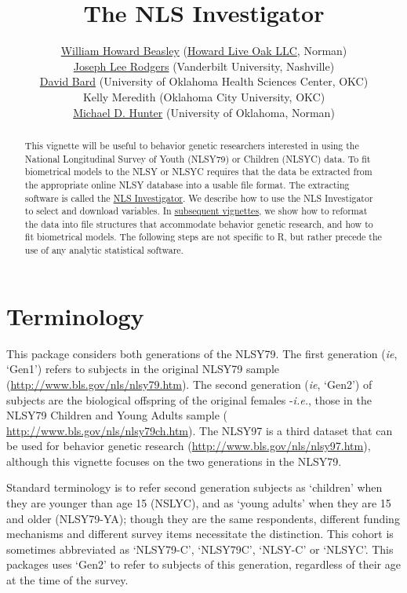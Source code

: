 \documentclass{article}\usepackage[]{graphicx}\usepackage[]{color}
\title{The NLS Investigator}
\author{
  \href{http://scholar.google.com/citations?user=ffsJTC0AAAAJ}{William Howard Beasley} (\href{http://howardliveoak.com/}{Howard Live Oak LLC}, Norman)\\
  \href{http://www.vanderbilt.edu/psychological_sciences/bio/joe-rodgers}{Joseph Lee Rodgers} (Vanderbilt University, Nashville)\\
  \href{http://find.ouhsc.edu/Faculty.aspx?FacultyID=1041}{David Bard} (University of Oklahoma Health Sciences Center, OKC)\\
  Kelly Meredith (Oklahoma City University, OKC)\\
  \href{http://students.ou.edu/H/Michael.D.Hunter-1/}{Michael D. Hunter} (University of Oklahoma, Norman)
}
\begin{document}
\newcommand{\code}[1]{\texttt{\small{#1}}}
\newcommand{\pkg}[1]{\textsf{\small{#1}}}
\let\proglang=\textsf
\newcommand{\R}{\proglang{R}} %

\maketitle
\tableofcontents

\begin{abstract}
This vignette will be useful to behavior genetic researchers interested in using the National Longitudinal Survey of Youth (NLSY79) or Children (NLSYC) data.  To fit biometrical models to the NLSY or NLSYC requires that the data be extracted from the appropriate online NLSY database into a usable file format.  The extracting software is called the \href{https://www.nlsinfo.org/investigator/pages/login.jsp}{NLS Investigator}.  We describe how to use the NLS Investigator to select and download variables.   In \href{http://cran.r-project.org/web/packages/NlsyLinks/}{subsequent vignettes}, we show how to reformat the data into file structures that accommodate behavior genetic research, and how to fit biometrical models.  The following steps are not specific to \R{}, but rather precede the use of any analytic statistical software.
\end{abstract}



\section{Terminology} %
This package considers both generations of the NLSY79.  The first generation (\emph{ie}, `Gen1') refers to subjects in the original NLSY79 sample (\url{http://www.bls.gov/nls/nlsy79.htm}).  The second generation (\emph{ie}, `Gen2') of subjects are the biological offspring of the original females -\emph{i.e.}, those in the NLSY79 Children and Young Adults sample ( \url{http://www.bls.gov/nls/nlsy79ch.htm}).  The NLSY97 is a third dataset that can be used for behavior genetic research (\url{http://www.bls.gov/nls/nlsy97.htm}), although this vignette focuses on the two generations in the NLSY79.

Standard terminology is to refer second generation subjects as `children' when they are younger than age 15 (NSLYC), and as `young adults' when they are 15 and older (NLSY79-YA); though they are the same respondents, different funding mechanisms and different survey items necessitate the distinction.  This cohort is sometimes abbreviated as `NLSY79-C', `NLSY79C', `NLSY-C' or `NLSYC'. This packages uses `Gen2' to refer to subjects of this generation, regardless of their age at the time of the survey.
\end{document}

